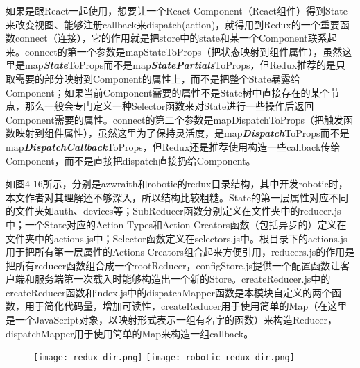 如果是跟React一起使用，想要让一个React Component（React组件）得到State来改变视图、能够注册callback来dispatch(action)，就得用到Redux的一个重要函数connect（连接），它的作用就是把store中的state和某一个Component联系起来。connect的第一个参数是mapStateToProps（把状态映射到组件属性），虽然这里是map\emph{\textbf{State}}ToProps而不是map\emph{\textbf{StatePartials}}ToProps，但Redux推荐的是只取需要的部分映射到Component的属性上，而不是把整个State暴露给Component；如果当前Component需要的属性不是State树中直接存在的某个节点，那么一般会专门定义一种Selector函数来对State进行一些操作后返回Component需要的属性。connect的第二个参数是mapDispatchToProps（把触发函数映射到组件属性），虽然这里为了保持灵活度，是map\emph{\textbf{Dispatch}}ToProps而不是map\emph{\textbf{DispatchCallback}}ToProps，但Redux还是推荐使用构造一些callback传给Component，而不是直接把dispatch直接扔给Component。

如图4-16所示，分别是azwraith和robotic的redux目录结构，其中开发robotic时，本文作者对其理解还不够深入，所以结构比较粗糙。State的第一层属性对应不同的文件夹如auth、devices等；SubReducer函数分别定义在文件夹中的reducer.js中；一个State对应的Action Types和Action Creators函数（包括异步的）定义在文件夹中的actions.js中；Selector函数定义在selectors.js中。根目录下的actions.js用于把所有第一层属性的Actions Creators组合起来方便引用，reducers.js的作用是把所有reducer函数组合成一个rootReducer，configStore.js提供一个配置函数让客户端和服务端第一次载入时能够构造出一个新的Store。createReducer.js中的createReducer函数和index.js中的dispatchMapper函数是本模块自定义的两个函数，用于简化代码量，增加可读性，createReducer用于使用简单的Map（在这里是一个JavaScript对象，以映射形式表示一组有名字的函数）来构造Reducer，dispatchMapper用于使用简单的Map来构造一组callback。
\begin{figure}[!htp]
 \centering
 \texttt{[image: redux\_dir.png]}
  \hspace{1cm}
 \texttt{[image: robotic\_redux\_dir.png]}
\end{figure}

